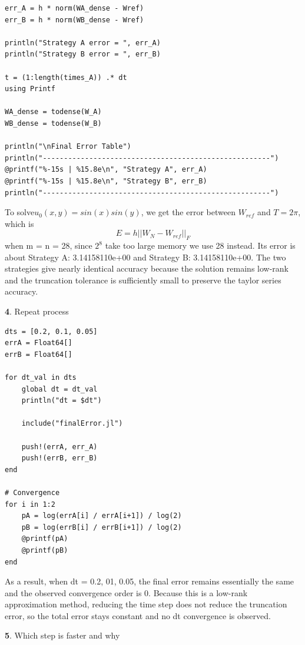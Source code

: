 \documentclass[11pt]{article}
\begin{document}
\begin{lstlisting}
err_A = h * norm(WA_dense - Wref)
err_B = h * norm(WB_dense - Wref)

println("Strategy A error = ", err_A)
println("Strategy B error = ", err_B)

t = (1:length(times_A)) .* dt
using Printf

WA_dense = todense(W_A)
WB_dense = todense(W_B)

println("\nFinal Error Table")
println("------------------------------------------------------")
@printf("%-15s | %15.8e\n", "Strategy A", err_A)
@printf("%-15s | %15.8e\n", "Strategy B", err_B)
println("------------------------------------------------------")

\end{lstlisting}

To solve$ u_0(x,y) = sin(x)sin(y)$, we get the error between $W_{ref}$ and $T = 2\pi$, which is
\[
E = h||W_N - W_{ref}||_F 
\]
when m = n = 28, since $2^8$ take too large memory we use 28 instead. Its error is about Strategy A:  3.14158110e+00 and Strategy B:  3.14158110e+00. The two strategies give nearly identical accuracy because the solution remains low-rank and the truncation tolerance is sufficiently small to preserve the taylor series accuracy.

\vspace{1.5em}

\textbf{4}. Repeat process

\begin{lstlisting}
dts = [0.2, 0.1, 0.05]
errA = Float64[]
errB = Float64[]

for dt_val in dts
    global dt = dt_val
    println("dt = $dt")

    include("finalError.jl")

    push!(errA, err_A)
    push!(errB, err_B)
end

# Convergence
for i in 1:2
    pA = log(errA[i] / errA[i+1]) / log(2)
    pB = log(errB[i] / errB[i+1]) / log(2)
    @printf(pA)
    @printf(pB)
end
\end{lstlisting}

As a result, when dt = 0.2, 01, 0.05, the final error remains essentially the same and the observed convergence order is 0. Because this is a low-rank approximation method, reducing the time step does not reduce the truncation error, so the total error stays constant and no dt convergence is observed.

\vspace{1.5em}

\textbf{5}. Which step is faster and why
\end{document}
